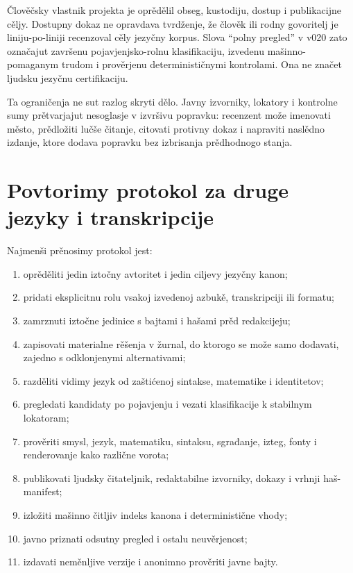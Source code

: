 \documentclass[11pt]{article}
\begin{document}
Člověčsky vlastnik projekta je oprědělil obseg, kustodiju, dostup i publikacijne cěljy. Dostupny dokaz ne opravdava tvrdženje, že člověk ili rodny govoritelj je liniju-po-liniji recenzoval cěly jezyčny korpus. Slova ``polny pregled'' v v020 zato označajut završenu pojavjenjsko-rolnu klasifikaciju, izvedenu mašinno-pomaganym trudom i prověrjenu determinističnymi kontrolami. Ona ne značet ljudsku jezyčnu certifikaciju.

Ta ograničenja ne sut razlog skryti dělo. Javny izvorniky, lokatory i kontrolne sumy prětvarjajut nesoglasje v izvršivu popravku: recenzent može imenovati město, prědložiti lučše čitanje, citovati protivny dokaz i napraviti naslědno izdanje, ktore dodava popravku bez izbrisanja prědhodnogo stanja.

\section{Povtorimy protokol za druge jezyky i transkripcije}

Najmenši prěnosimy protokol jest:

\begin{enumerate}
\item oprěděliti jedin iztočny avtoritet i jedin ciljevy jezyčny kanon;
\item pridati eksplicitnu rolu vsakoj izvedenoj azbukě, transkripciji ili formatu;
\item zamrznuti iztočne jedinice s bajtami i hašami prěd redakcijeju;
\item zapisovati materialne rěšenja v žurnal, do ktorogo se može samo dodavati, zajedno s odklonjenymi alternativami;
\item razděliti vidimy jezyk od zaštićenoj sintakse, matematike i identitetov;
\item pregledati kandidaty po pojavjenju i vezati klasifikacije k stabilnym lokatoram;
\item prověriti smysl, jezyk, matematiku, sintaksu, sgrađanje, izteg, fonty i renderovanje kako različne vorota;
\item publikovati ljudsky čitateljnik, redaktabilne izvorniky, dokazy i vrhnji haš-manifest;
\item izložiti mašinno čitljiv indeks kanona i deterministične vhody;
\item javno priznati odsutny pregled i ostalu neuvěrjenost;
\item izdavati neměnljive verzije i anonimno prověriti javne bajty.
\end{enumerate}
\end{document}
